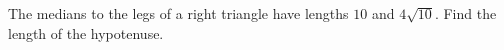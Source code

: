The medians to the legs of a right triangle have lengths $10$ and $4\sqrt{10}$. Find the length of the hypotenuse.
